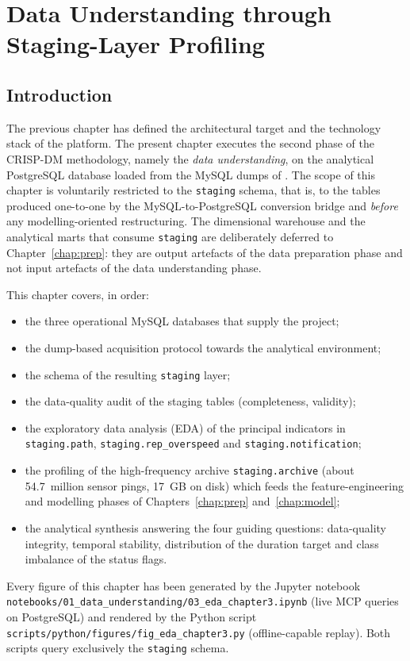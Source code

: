 \chapter{Data Understanding through Staging-Layer Profiling}
\label{chap:data}

\section{Introduction}
The previous chapter has defined the architectural target and the technology stack of the platform. The present chapter executes the second phase of the CRISP-DM methodology, namely the \emph{data understanding}, on the analytical PostgreSQL database loaded from the MySQL dumps of \hostorg{}. The scope of this chapter is voluntarily restricted to the \texttt{staging} schema, that is, to the tables produced one-to-one by the MySQL-to-PostgreSQL conversion bridge and \emph{before} any modelling-oriented restructuring. The dimensional warehouse and the analytical marts that consume \texttt{staging} are deliberately deferred to Chapter~\ref{chap:prep}: they are output artefacts of the data preparation phase and not input artefacts of the data understanding phase.

This chapter covers, in order:
\begin{itemize}
    \item the three operational MySQL databases that supply the project;
    \item the dump-based acquisition protocol towards the analytical environment;
    \item the schema of the resulting \texttt{staging} layer;
    \item the data-quality audit of the staging tables (completeness, validity);
    \item the exploratory data analysis (EDA) of the principal indicators in \texttt{staging.path}, \texttt{staging.rep\_overspeed} and \texttt{staging.notification};
    \item the profiling of the high-frequency archive \texttt{staging.archive} (about 54.7~million sensor pings, 17~GB on disk) which feeds the feature-engineering and modelling phases of Chapters~\ref{chap:prep} and~\ref{chap:model};
    \item the analytical synthesis answering the four guiding questions: data-quality integrity, temporal stability, distribution of the duration target and class imbalance of the status flags.
\end{itemize}
Every figure of this chapter has been generated by the Jupyter notebook \texttt{notebooks/01\_data\_understanding/03\_eda\_chapter3.ipynb} (live MCP queries on PostgreSQL) and rendered by the Python script \texttt{scripts/python/figures/fig\_eda\_chapter3.py} (offline-capable replay). Both scripts query exclusively the \texttt{staging} schema.

